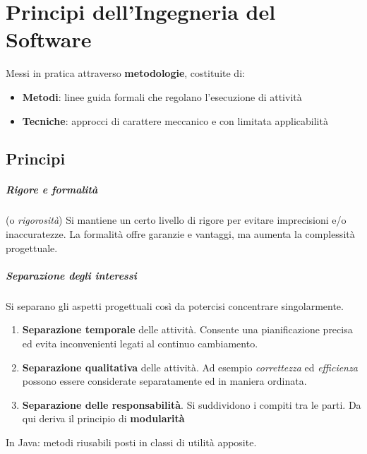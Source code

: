 \chapter{Principi dell'Ingegneria del Software}

Messi in pratica attraverso \textbf{metodologie}, costituite di:
\begin{itemize}
    \item \textbf{Metodi}: linee guida formali che regolano l'esecuzione di attività
    \item \textbf{Tecniche}: approcci di carattere meccanico e con limitata applicabilità
\end{itemize}

\section{Principi}

\paragraph{Rigore e formalità} (o \textit{rigorosità}) Si mantiene un certo livello di rigore per evitare imprecisioni e/o inaccuratezze. La formalità offre garanzie e vantaggi, ma aumenta la complessità progettuale.

\paragraph{Separazione degli interessi} Si separano gli aspetti progettuali così da potercisi concentrare singolarmente.
\begin{enumerate}
    \item \textbf{Separazione temporale} delle attività. Consente una pianificazione precisa ed evita inconvenienti legati al continuo cambiamento.
    \item \textbf{Separazione qualitativa} delle attività. Ad esempio \textit{correttezza} ed \textit{efficienza} possono essere considerate separatamente ed in maniera ordinata.
    \item \textbf{Separazione delle responsabilità}. Si suddividono i compiti tra le parti. Da qui deriva il principio di \textbf{modularità}
\end{enumerate}
In Java: metodi riusabili posti in classi di utilità apposite.

